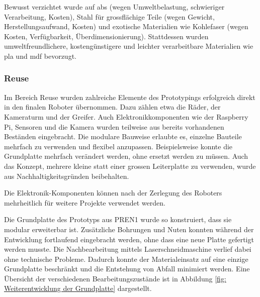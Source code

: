 Bewusst verzichtet wurde auf \acrshort{abs} (wegen Umweltbelastung, schwieriger Verarbeitung, Kosten), Stahl für grossflächige Teile (wegen Gewicht, Herstellungsaufwand, Kosten) und exotische Materialien wie Kohlefaser (wegen Kosten, Verfügbarkeit, Überdimensionierung). Stattdessen wurden umweltfreundlichere, kostengünstigere und leichter verarbeitbare Materialien wie \acrshort{pla} und \acrshort{mdf} bevorzugt.



\subsubsection{Reuse}

Im Bereich Reuse wurden zahlreiche Elemente des Prototypings erfolgreich direkt in den finalen Roboter übernommen. Dazu zählen etwa die Räder, der Kameraturm und der Greifer. Auch Elektronikkomponenten wie der Raspberry Pi, Sensoren und die Kamera wurden teilweise aus bereits vorhandenen Beständen eingebracht. Die modulare Bauweise erlaubte es, einzelne Bauteile mehrfach zu verwenden und flexibel anzupassen. Beispielsweise konnte die Grundplatte mehrfach verändert werden, ohne ersetzt werden zu müssen. Auch das Konzept, mehrere kleine statt einer grossen Leiterplatte zu verwenden, wurde aus Nachhaltigkeitsgründen beibehalten.

Die Elektronik-Komponenten können nach der Zerlegung des Roboters mehrheitlich für weitere Projekte verwendet werden.

Die Grundplatte des Prototyps aus PREN1 wurde so konstruiert, dass sie modular erweiterbar ist. Zusätzliche Bohrungen und Nuten konnten während der Entwicklung fortlaufend eingebracht werden, ohne dass eine neue Platte gefertigt werden musste. Die Nachbearbeitung mittels Laserschneidmaschine verlief dabei ohne technische Probleme. Dadurch konnte der Materialeinsatz auf eine einzige Grundplatte beschränkt und die Entstehung von Abfall minimiert werden. Eine Übersicht der verschiedenen Bearbeitungszustände ist in Abbildung \ref{fig: Weiterentwicklung der Grundplatte} dargestellt.

